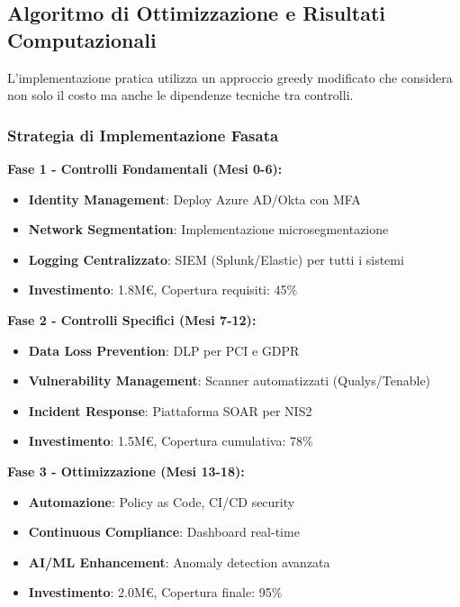 \subsection{Algoritmo di Ottimizzazione e Risultati Computazionali}

L'implementazione pratica utilizza un approccio greedy modificato che considera non solo il costo ma anche le dipendenze tecniche tra controlli\autocite{Chvatal1979}.

\subsubsection{Strategia di Implementazione Fasata}

\textbf{Fase 1 - Controlli Fondamentali (Mesi 0-6):}
\begin{itemize}
    \item \textbf{Identity Management}: Deploy Azure AD/Okta con MFA
    \item \textbf{Network Segmentation}: Implementazione microsegmentazione
    \item \textbf{Logging Centralizzato}: SIEM (Splunk/Elastic) per tutti i sistemi
    \item \textbf{Investimento}: 1.8M€, Copertura requisiti: 45\%
\end{itemize}

\textbf{Fase 2 - Controlli Specifici (Mesi 7-12):}
\begin{itemize}
    \item \textbf{Data Loss Prevention}: DLP per PCI e GDPR
    \item \textbf{Vulnerability Management}: Scanner automatizzati (Qualys/Tenable)
    \item \textbf{Incident Response}: Piattaforma SOAR per NIS2
    \item \textbf{Investimento}: 1.5M€, Copertura cumulativa: 78\%
\end{itemize}

\textbf{Fase 3 - Ottimizzazione (Mesi 13-18):}
\begin{itemize}
    \item \textbf{Automazione}: Policy as Code, CI/CD security
    \item \textbf{Continuous Compliance}: Dashboard real-time
    \item \textbf{AI/ML Enhancement}: Anomaly detection avanzata
    \item \textbf{Investimento}: 2.0M€, Copertura finale: 95\%
\end{itemize}


